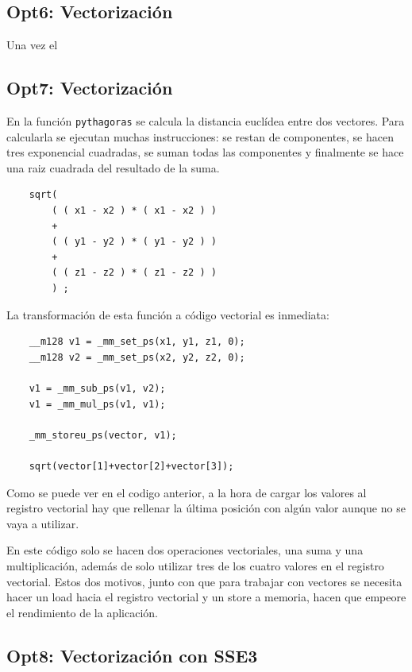 \subsection{Opt6: Vectorizaci\'{o}n}

Una vez el 


\subsection{Opt7: Vectorizaci\'{o}n}

En la funci\'{o}n \texttt{pythagoras} se calcula la distancia eucl\'{i}dea
entre dos vectores. Para calcularla se ejecutan muchas instrucciones: se restan
de componentes, se hacen tres exponencial cuadradas, se suman todas las
componentes y finalmente se hace una raiz cuadrada del resultado de la suma.

\begin{lstlisting}
	sqrt( 
		( ( x1 - x2 ) * ( x1 - x2 ) ) 
		+ 
		( ( y1 - y2 ) * ( y1 - y2 ) ) 
		+ 
		( ( z1 - z2 ) * ( z1 - z2 ) ) 
		) ;
\end{lstlisting}

La transformaci\'{o}n de esta funci\'{o}n a c\'{o}digo vectorial es inmediata:

\begin{lstlisting}
	__m128 v1 = _mm_set_ps(x1, y1, z1, 0);
	__m128 v2 = _mm_set_ps(x2, y2, z2, 0);
	
	v1 = _mm_sub_ps(v1, v2);
	v1 = _mm_mul_ps(v1, v1);
	
	_mm_storeu_ps(vector, v1);
	
	sqrt(vector[1]+vector[2]+vector[3]);
\end{lstlisting}

Como se puede ver en el codigo anterior, a la hora de cargar los valores al
registro vectorial hay que rellenar la \'{u}ltima posici\'{o}n con alg\'{u}n
valor aunque no se vaya a utilizar.

En este c\'{o}digo solo se hacen dos operaciones vectoriales, una suma y una
multiplicaci\'{o}n, adem\'{a}s de solo utilizar tres de los cuatro valores en
el registro vectorial. Estos dos motivos, junto con que para trabajar con
vectores se necesita hacer un load hacia el registro vectorial y un store a
memoria, hacen que empeore el rendimiento de la aplicaci\'{o}n.

\subsection{Opt8: Vectorizaci\'{o}n con SSE3}

